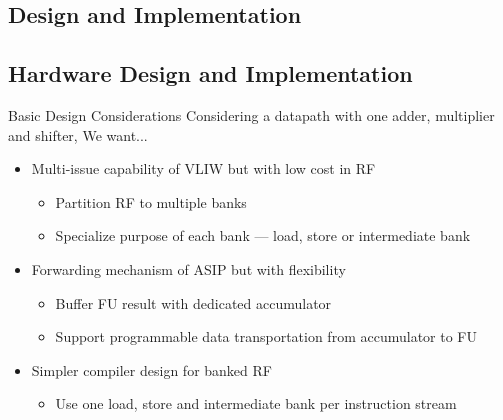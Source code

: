 \documentclass{beamer}
\begin{document}
\begin{CJK}{UTF8}{bkai}


            \section{Design and Implementation}

            \subsection{Hardware Design and Implementation}
            \begin{frame}{Basic Design Considerations}
                Considering a datapath with one adder, multiplier and shifter, We want... \\
                \begin{itemize}
                    \item Multi-issue capability of VLIW but with low cost in RF
                        \begin{itemize}
                            \item Partition RF to multiple banks
                            \item Specialize purpose of each bank --- load, store or intermediate bank
                        \end{itemize}
                    \item Forwarding mechanism of ASIP but with flexibility
                        \begin{itemize}
                            \item Buffer FU result with dedicated accumulator
                            \item Support programmable data transportation from accumulator to FU
                        \end{itemize}
                    \item Simpler compiler design for banked RF
                        \begin{itemize}
                            \item Use one load, store and intermediate bank per instruction stream 

\end{itemize}
\end{itemize}
\end{frame}
\end{CJK}
\end{document}
